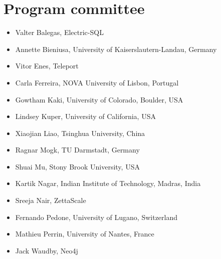 \documentclass[sigplan,review]{acmart}
\begin{document}
\section*{Program committee}

\begin{itemize}
\item Valter Balegas, Electric-SQL
\item Annette Bieniusa, University of Kaiserslautern-Landau, Germany
\item Vitor Enes, Teleport
\item Carla Ferreira, NOVA University of Lisbon, Portugal
\item Gowtham Kaki, University of Colorado, Boulder, USA
\item Lindsey Kuper, University of California, USA
\item Xiaojian Liao, Tsinghua University, China
\item Ragnar Mogk, TU Darmstadt, Germany
\item Shuai Mu, Stony Brook University, USA
\item Kartik Nagar, Indian Institute of Technology, Madras, India
\item Sreeja Nair, ZettaScale
\item Fernando Pedone, University of Lugano, Switzerland
\item Mathieu Perrin, University of Nantes, France
\item Jack Waudby, Neo4j
\end{itemize}


\end{document}
